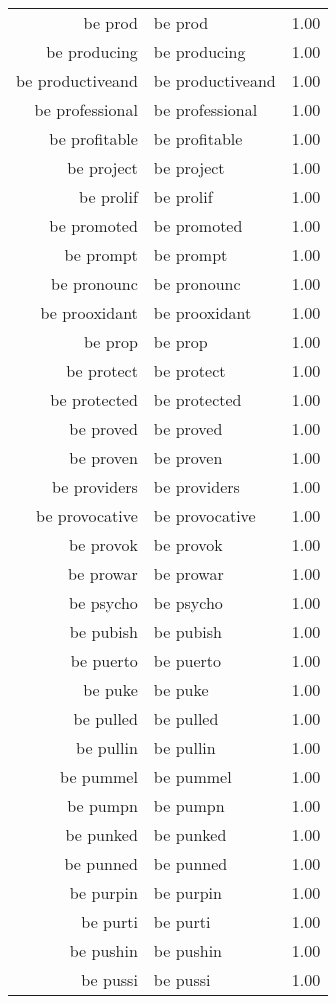 \begin{table}[ht]
\begin{tabular}{rlr}
  be prod & be prod & 1.00 \\ 
  be producing & be producing & 1.00 \\ 
  be productiveand & be productiveand & 1.00 \\ 
  be professional & be professional & 1.00 \\ 
  be profitable & be profitable & 1.00 \\ 
  be project & be project & 1.00 \\ 
  be prolif & be prolif & 1.00 \\ 
  be promoted & be promoted & 1.00 \\ 
  be prompt & be prompt & 1.00 \\ 
  be pronounc & be pronounc & 1.00 \\ 
  be prooxidant & be prooxidant & 1.00 \\ 
  be prop & be prop & 1.00 \\ 
  be protect & be protect & 1.00 \\ 
  be protected & be protected & 1.00 \\ 
  be proved & be proved & 1.00 \\ 
  be proven & be proven & 1.00 \\ 
  be providers & be providers & 1.00 \\ 
  be provocative & be provocative & 1.00 \\ 
  be provok & be provok & 1.00 \\ 
  be prowar & be prowar & 1.00 \\ 
  be psycho & be psycho & 1.00 \\ 
  be pubish & be pubish & 1.00 \\ 
  be puerto & be puerto & 1.00 \\ 
  be puke & be puke & 1.00 \\ 
  be pulled & be pulled & 1.00 \\ 
  be pullin & be pullin & 1.00 \\ 
  be pummel & be pummel & 1.00 \\ 
  be pumpn & be pumpn & 1.00 \\ 
  be punked & be punked & 1.00 \\ 
  be punned & be punned & 1.00 \\ 
  be purpin & be purpin & 1.00 \\ 
  be purti & be purti & 1.00 \\ 
  be pushin & be pushin & 1.00 \\ 
  be pussi & be pussi & 1.00 \\ 

\end{tabular}
\end{table}
